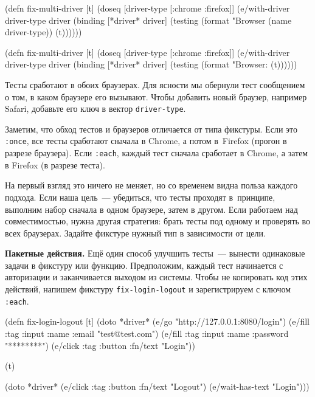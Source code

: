 \ifnarrow

\begin{english}
  \begin{clojure}
(defn fix-multi-driver [t]
  (doseq [driver-type [:chrome :firefox]]
    (e/with-driver driver-type {} driver
      (binding [*driver* driver]
        (testing (format "Browser %
                   (name driver-type))
          (t))))))
  \end{clojure}
\end{english}

\else

\begin{english}
  \begin{clojure}
(defn fix-multi-driver [t]
  (doseq [driver-type [:chrome :firefox]]
    (e/with-driver driver-type {} driver
      (binding [*driver* driver]
        (testing (format "Browser: %
          (t))))))
  \end{clojure}
\end{english}

\fi

Тесты сработают в обоих браузерах. Для ясности мы обернули тест сообщением о
том, в каком браузере его вызывают. Чтобы добавить новый браузер, например
Safari, добавьте его ключ в вектор \verb|driver-type|.


Заметим, что обход тестов и браузеров отличается от типа фикстуры. Если это
\verb|:once|, все тесты сработают сначала в Chrome, а потом в~Firefox (прогон в
разрезе браузера). Если \verb|:each|, каждый тест сначала сработает в Chrome, а
затем в Firefox (в разрезе теста).

На первый взгляд это ничего не меняет, но со временем видна польза каждого
подхода. Если наша цель~--- убедиться, что тесты проходят в~принципе, выполним
набор сначала в одном браузере, затем в другом. Если работаем над
совместимостью, нужна другая стратегия: брать тесты под одному и проверять во
всех браузерах. Задайте фикстуре нужный тип в зависимости от цели.

\textbf{Пакетные действия.} Ещё один способ улучшить тесты~--- вынести
одинаковые задачи в фикстуру или функцию. Предположим, каждый тест начинается с
авторизации и заканчивается выходом из системы. Чтобы не копировать код этих
действий, напишем фикстуру \verb|fix-login-logout| и зарегистрируем с ключом
\verb|:each|.


\begin{english}
  \begin{clojure}
(defn fix-login-logout [t]
  (doto *driver*
    (e/go "http://127.0.0.1:8080/login")
    (e/fill {:tag :input :name :email}
            "test@test.com")
    (e/fill {:tag :input :name :password}
            "********")
    (e/click {:tag :button
              :fn/text "Login"}))

  (t)

  (doto *driver*
    (e/click {:tag :button
              :fn/text "Logout"})
    (e/wait-has-text "Login")))
  \end{clojure}
\end{english}

